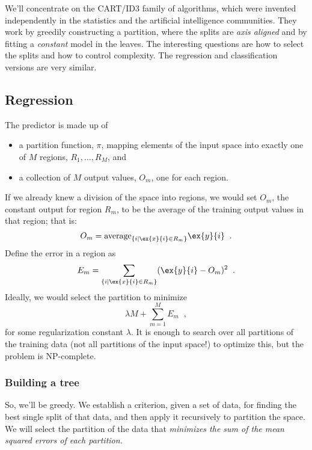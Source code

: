 We'll concentrate on the CART/ID3 family of algorithms, which were
invented independently in the statistics and the artificial
intelligence communities.  They work by greedily constructing a
partition, where the splits are {\em axis aligned} and by fitting a
{\em constant} model in the leaves.  The interesting questions are how
to select the splits and how to control complexity.  The regression
and classification versions are very similar.

\subsection{Regression}

\def\Rfeat{R}
\def\Rdata{\hat{R}}

The predictor is made up of
\begin{itemize}
\item a partition function, $\pi$, mapping elements of the input space into
  exactly one of $M$ regions, $\Rfeat_1, \ldots, \Rfeat_M$, and
\item a collection of $M$ output values, $O_m$, one for each region.
\end{itemize}

If we already knew a division of the space into regions, we would set
$O_m$, the constant output for region $\Rfeat_m$, to be the average of
the training output values in that region;  that is:
\[O_m = {\rm average}_{\{i \mid \ex{x}{i} \in R_m\}}\ex{y}{i}\;\;.\]
Define the error in a region as
\begin{equation}
  E_m = \sum_{\{i \mid \ex{x}{i} \in R_m\}}(\ex{y}{i} - O_m)^2\;\;.
\end{equation}
Ideally, we would select the partition to minimize
\begin{equation}
  \lambda M + \sum_{m=1}^M E_m\;\;,
\end{equation}
for some regularization constant $\lambda$.  It is enough to search over all
partitions of the training data (not all partitions of the input
space!) to optimize this, but the problem is NP-complete.

\subsubsection{Building a tree}
So, we'll be greedy.  We establish a criterion, given a set of data,
for finding the best single split of that data, and then apply it
recursively to partition the space.  We will select the partition of
the data that {\em minimizes the sum of the mean squared errors of
  each partition.}

